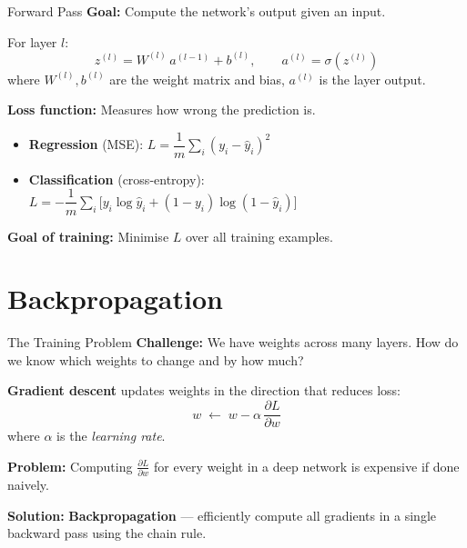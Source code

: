 \documentclass[10pt]{beamer}
\begin{document}
\begin{frame}{Forward Pass}
    \textbf{Goal:} Compute the network's output given an input.

    \vspace{0.2cm}
    For layer $l$:
    \[
        z^{(l)} = W^{(l)}\, a^{(l-1)} + b^{(l)}, \qquad a^{(l)} = \sigma\!\left(z^{(l)}\right)
    \]
    where $W^{(l)}, b^{(l)}$ are the weight matrix and bias, $a^{(l)}$ is the layer output.

    \vspace{0.2cm}
    \textbf{Loss function:} Measures how wrong the prediction is.
    \begin{itemize}
        \item \textbf{Regression} (MSE): $L = \dfrac{1}{m}\displaystyle\sum_i (y_i - \hat{y}_i)^2$
        \item \textbf{Classification} (cross-entropy):
        $L = -\dfrac{1}{m}\displaystyle\sum_i\bigl[y_i \log \hat{y}_i + (1-y_i)\log(1-\hat{y}_i)\bigr]$
    \end{itemize}

    \vspace{0.2cm}
    \textbf{Goal of training:} Minimise $L$ over all training examples.
\end{frame}

\section{Backpropagation}

\begin{frame}{The Training Problem}
    \textbf{Challenge:} We have weights across many layers. How do we know which weights to change and by how much?

    \vspace{0.3cm}
    \textbf{Gradient descent} updates weights in the direction that reduces loss:
    \[
        w \;\gets\; w - \alpha\,\frac{\partial L}{\partial w}
    \]
    where $\alpha$ is the \emph{learning rate}.

    \vspace{0.3cm}
    \textbf{Problem:} Computing $\frac{\partial L}{\partial w}$ for every weight in a deep network is expensive if done naively.

    \vspace{0.2cm}
    \textbf{Solution:} \textbf{Backpropagation} --- efficiently compute all gradients in a single backward pass using the chain rule.
\end{frame}
\end{document}
